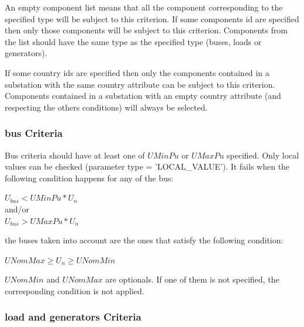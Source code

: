 \documentclass[a4paper, 12pt]{report}
\begin{document}
An empty component list means that all the component corresponding to the specified type will be subject to this
criterion. If some components id are specified then only those components will
be subject to this criterion. Components from the list should have the same type as the
specified type (buses, loads or generators).

If some country ids are specified then only the components contained in a
substation with the same country attribute can be subject to this
criterion. Components contained in a substation with an empty country attribute
(and respecting the others conditions) will always be selected.

\subsubsection{bus Criteria}

Bus criteria should have at least one of $UMinPu$ or $UMaxPu$ specified. Only
local values can be checked (parameter type = 'LOCAL\_VALUE').
It fails when the following condition happens for any of the bus: \\
\begin{center}
$U_{bus} < UMinPu*U_n$\\
and/or\\
$U_{bus} > UMaxPu*U_n$ \\
\end{center}
the buses taken into account are the ones that satisfy the
following condition:
\begin{center}
$UNomMax \ge U_n \ge UNomMin$\\
\end{center}

$UNomMin$ and $UNomMax$ are optionals. If one of them is not
specified, the corresponding condition is not applied.

\subsubsection{load and generators Criteria}
\end{document}
